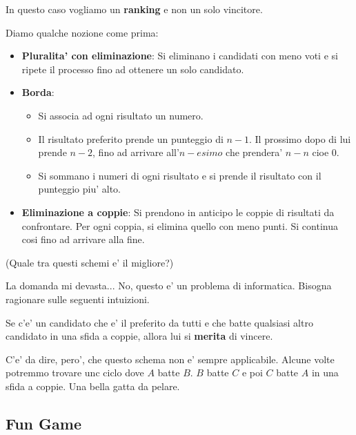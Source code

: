 In questo caso vogliamo un \textbf{ranking} e non un solo vincitore.

Diamo qualche nozione come prima:

\begin{itemize}
    \item \textbf{Pluralita' con eliminazione}: Si eliminano i candidati con meno voti e si ripete il processo fino ad ottenere un solo candidato.
    \item \textbf{Borda}:
          \begin{itemize}
              \item Si associa ad ogni risultato un numero.
              \item Il risultato preferito prende un punteggio di $n-1$. Il prossimo dopo di lui
                    prende $n-2$, fino ad arrivare all'$n-esimo$ che prendera' $n-n$ cioe $0$.
              \item Si sommano i numeri di ogni risultato e si prende il risultato con il punteggio
                    piu' alto.
          \end{itemize}
    \item \textbf{Eliminazione a coppie}: Si prendono in anticipo le coppie di risultati da confrontare. Per ogni coppia, si elimina quello con meno punti. Si continua cosi fino ad arrivare alla fine.
\end{itemize}

\begin{domanda}
    (Quale tra questi schemi e' il migliore?)

    La domanda mi devasta... No, questo e' un problema di informatica. Bisogna
    ragionare sulle seguenti intuizioni.

    Se c'e' un candidato che e' il preferito da tutti e che batte qualsiasi altro
    candidato in una sfida a coppie, allora lui si \textbf{merita} di vincere.

    C'e' da dire, pero', che questo schema non e' sempre applicabile. Alcune volte
    potremmo trovare unc ciclo dove $A$ batte $B$. $B$ batte $C$ e poi $C$ batte
    $A$ in una sfida a coppie. Una bella gatta da pelare.
\end{domanda}

\subsection{Fun Game}

